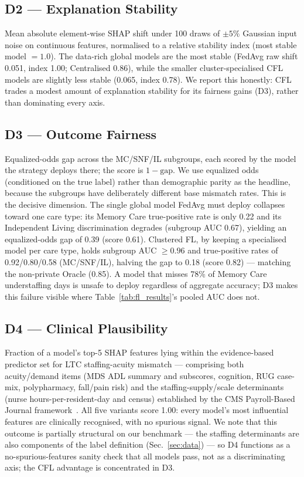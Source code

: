 \documentclass[journal]{IEEEtran}
\begin{document}
\subsection{D2 — Explanation Stability}
Mean absolute element-wise SHAP shift under 100 draws of $\pm5\%$ Gaussian input
noise on continuous features, normalised to a relative stability index (most
stable model $=1.0$). The data-rich global models are the most stable (FedAvg
raw shift 0.051, index 1.00; Centralised 0.86), while the smaller
cluster-specialised CFL models are slightly less stable (0.065, index 0.78).
We report this honestly: CFL trades a modest amount of explanation stability for
its fairness gains (D3), rather than dominating every axis.

\subsection{D3 — Outcome Fairness}
Equalized-odds gap across the MC/SNF/IL subgroups, each scored by the model the
strategy deploys there; the score is $1 - \text{gap}$. We use equalized odds
(conditioned on the true label) rather than demographic parity as the headline,
because the subgroups have deliberately different base mismatch rates. This is
the decisive dimension. The single global model FedAvg must deploy collapses
toward one care type: its Memory Care true-positive rate is only 0.22 and its
Independent Living discrimination degrades (subgroup AUC 0.67), yielding an
equalized-odds gap of 0.39 (score 0.61). Clustered FL, by keeping a specialised
model per care type, holds subgroup AUC $\geq 0.96$ and true-positive rates of
0.92/0.80/0.58 (MC/SNF/IL), halving the gap to 0.18 (score 0.82) --- matching the
non-private Oracle (0.85). A model that misses 78\% of Memory Care understaffing
days is unsafe to deploy regardless of aggregate accuracy; D3 makes this failure
visible where Table~\ref{tab:fl_results}'s pooled AUC does not.

\subsection{D4 — Clinical Plausibility}
Fraction of a model's top-5 SHAP features lying within the evidence-based
predictor set for LTC staffing-acuity mismatch --- comprising both acuity/demand
items (MDS ADL summary and subscores, cognition, RUG case-mix, polypharmacy,
fall/pain risk) and the staffing-supply/scale determinants (nurse
hours-per-resident-day and census) established by the CMS Payroll-Based Journal
framework~\cite{harrington2020,dellefield2015staffing}. All five variants score
1.00: every model's most influential features are clinically recognised, with no
spurious signal. We note that this outcome is partially structural on our
benchmark --- the staffing determinants are also components of the label
definition (Sec.~\ref{sec:data}) --- so D4 functions as a no-spurious-features
sanity check that all models pass, not as a discriminating axis; the CFL
advantage is concentrated in D3.
\end{document}
